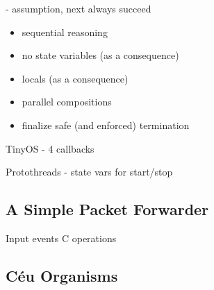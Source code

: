 \documentclass{sig-alternate-ipsn13}
\newcommand{\CEU}{\textsc{C\'{e}u}\xspace}
\begin{document}
\begin{comment}

The conjunction of parallel compositions with the synchronous execution model 
provides precise information about the control flow of applications to the 
compiler of \CEU, enabling a number of static guarantees with precise 
information about the control flow of applications
- safety: bounded mem/exec,
- other features

\begin{lstlisting}
 == TYPES:
    * PKT_t
        the packet data type for the protocol

 == FUNCTIONS:
    * PKT_send
        transmits a protocol packet
    * PKT_cancel
        cancels a packet transmition
    * PKT_next
        gets the next hop to forward

 == EVENTS:
    * START
        a request to start the protocol
    * STOP
        a request to stop the protocol
    * RECEIVE
        an arriving protocol packet
    * SENDDONE
        a packet transmition acknowledgement
\end{lstlisting}
\end{comment}

- assumption, next always succeed

\begin{itemize}
\item sequential reasoning
\item no state variables (as a consequence)
\item locals (as a consequence)
\item parallel compositions
\item finalize safe (and enforced) termination
\end{itemize}

TinyOS
- 4 callbacks

Protothreads
- state vars for start/stop

\subsection{A Simple Packet Forwarder}

Input events
C operations

\subsection{C\'eu Organisms}
\end{document}
